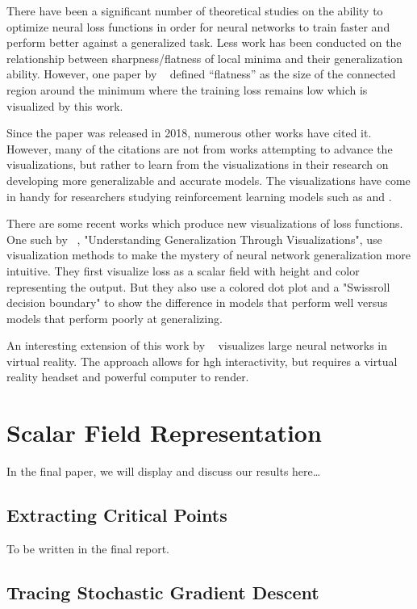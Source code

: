 \documentclass{acmsiggraph}               %
\begin{document}
There have been a significant number of theoretical studies on the ability to optimize neural loss functions in order for neural networks to train faster and 
perform better against a generalized task. Less work has been conducted on the relationship between sharpness/flatness of local minima and their
generalization ability. However, one paper by ~\cite{hochreiter1997flat} defined “flatness” as the size of the connected
region around the minimum where the training loss remains low which is visualized by this work.

Since the paper was released in 2018, numerous other works have cited it. However, many of the citations are not from works attempting to advance the visualizations,
but rather to learn from the visualizations in their research on developing more generalizable and accurate models. The visualizations have come in handy for researchers studying reinforcement learning models
such as \cite{actor2020} and \cite{plaat2022deep}.

There are some recent works which produce new visualizations of loss functions. One such by ~\cite{pmlr-v137-huang20a}, "Understanding Generalization Through Visualizations", use 
visualization methods to make the mystery of neural network generalization more intuitive. They first visualize loss as a scalar field with height and color
representing the output. But they also use a colored dot plot and a "Swissroll decision boundary" to show the difference in models that perform well versus
models that perform poorly at generalizing.

An interesting extension of this work by ~\cite{linse2022walk} visualizes large neural networks in virtual reality. The approach allows for 
hgh interactivity, but requires a virtual reality headset and powerful computer to render.


\section{Scalar Field Representation}
\label{sec:representation}

In the final paper, we will display and discuss our results here\dots

\subsection{Extracting Critical Points}
\label{sec:pen_and_ink}

To be written in the final report.

\subsection{Tracing Stochastic Gradient Descent}
\label{sec:pen_and_ink}
\end{document}
